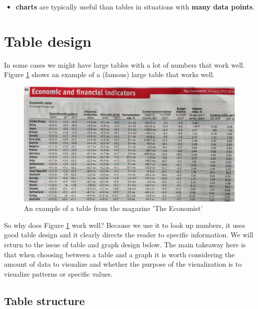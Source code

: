 \documentclass[]{book}
\providecommand{\tightlist}{%
  \setlength{\itemsep}{0pt}\setlength{\parskip}{0pt}}
\begin{document}
\begin{itemize}
\tightlist
\item
  \textbf{charts} are typically useful than tables in situations with \textbf{many data points}.
\end{itemize}

\hypertarget{table-design}{%
\section{Table design}\label{table-design}}

In some cases we might have large tables with a lot of numbers that work well. Figure \ref{fig:viz4} shows an example of a (famous) large table that works well.

\begin{figure}

{\centering \includegraphics[width=0.9\linewidth]{_resources/chapter_viz/figecon} 

}

\caption{An example of a table from the magazine 'The Economist'}\label{fig:viz4}
\end{figure}

So why does Figure \ref{fig:viz4} work well? Because we use it to look up numbers, it uses good table design and it clearly directs the reader to specific information.
We will return to the issue of table and graph design below. The main takeaway here is that when choosing between a table and a graph it is worth considering the amount of data to visualize and whether the purpose of the visualization is to visualize patterns or specific values.

\hypertarget{table-structure}{%
\subsection{Table structure}\label{table-structure}}
\end{document}
